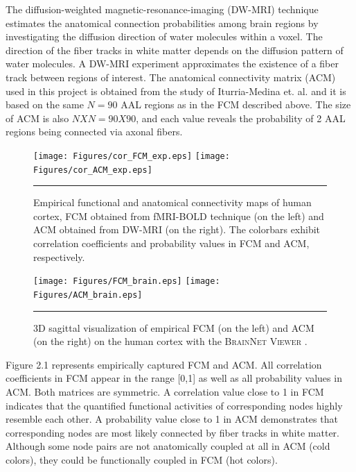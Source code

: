 The diffusion-weighted magnetic-resonance-imaging (DW-MRI) technique estimates the anatomical connection probabilities among brain regions by investigating the diffusion direction of water molecules within a voxel. The direction of the fiber tracks in white matter depends on the diffusion pattern of water molecules. A DW-MRI experiment approximates the existence of a fiber track between regions of interest. The anatomical connectivity matrix (ACM) used in this project is obtained from the study of Iturria-Medina et. al. \citep{ITU08} and it is based on the same $N=90$ AAL regions as in the FCM described above. The size of ACM is also $NXN = 90X90$, and each value reveals the probability of 2 AAL regions being connected via axonal fibers. 
  
\begin{figure}[htbp]
 
  \centering
	 \texttt{[image: Figures/cor\_FCM\_exp.eps]} 
	 \texttt{[image: Figures/cor\_ACM\_exp.eps]} 
	
    \rule{35em}{0.5pt}
  \caption[Empirical FCM and ACM]{Empirical functional and anatomical connectivity maps of human cortex, FCM obtained from fMRI-BOLD technique (on the left) and ACM obtained from DW-MRI (on the right). The colorbars exhibit correlation coefficients and probability values in FCM and ACM, respectively. }
  \label{fig:Empirical FCM and ACM}
 	
\end{figure}  

 
\begin{figure}[htbp]
 
  \centering
	 \texttt{[image: Figures/FCM\_brain.eps]} 
	 \texttt{[image: Figures/ACM\_brain.eps]} 
    \rule{35em}{0.5pt}
  \caption[Empirical FCM and ACM in cortex]{3D sagittal visualization of empirical FCM (on the left) and ACM (on the right) on the human cortex with the \textsc{BrainNet Viewer} \citep{XYZ13}. } 
  \label{fig:Empirical FCM and ACM in cortex}
 	
\end{figure} 

Figure 2.1 represents empirically captured FCM and ACM. All correlation coefficients in FCM appear in the range [0,1] as well as all probability values in ACM. Both matrices are symmetric. A correlation value close to 1 in FCM indicates that the quantified functional activities of corresponding nodes highly resemble each other. A probability value close to 1 in ACM demonstrates that corresponding nodes are most likely connected by fiber tracks in white matter. Although some node pairs are not anatomically coupled at all in ACM (cold colors), they could be functionally coupled in FCM (hot colors).    

